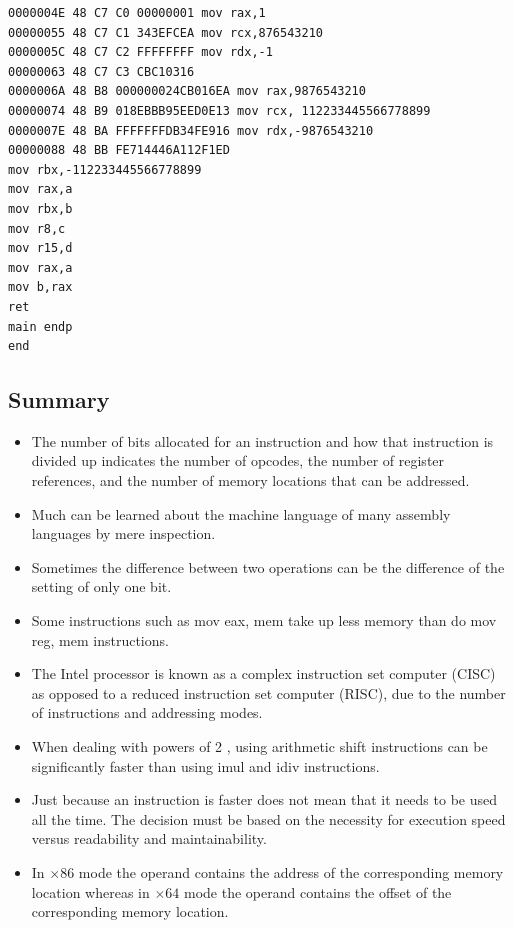 \documentclass[10pt]{book}
\begin{document}
\begin{verbatim}
0000004E 48 C7 C0 00000001 mov rax,1
00000055 48 C7 C1 343EFCEA mov rcx,876543210
0000005C 48 C7 C2 FFFFFFFF mov rdx,-1
00000063 48 C7 C3 CBC10316
0000006A 48 B8 000000024CB016EA mov rax,9876543210
00000074 48 B9 018EBBB95EED0E13 mov rcx, 112233445566778899
0000007E 48 BA FFFFFFFDB34FE916 mov rdx,-9876543210
00000088 48 BB FE714446A112F1ED
mov rbx,-112233445566778899
mov rax,a
mov rbx,b
mov r8,c
mov r15,d
mov rax,a
mov b,rax
ret
main endp
end
\end{verbatim}

\subsection{Summary}
\begin{itemize}
  \item The number of bits allocated for an instruction and how that instruction is divided up indicates the number of opcodes, the number of register references, and the number of memory locations that can be addressed.
  \item Much can be learned about the machine language of many assembly languages by mere inspection.
  \item Sometimes the difference between two operations can be the difference of the setting of only one bit.
  \item Some instructions such as mov eax, mem take up less memory than do mov reg, mem instructions.
  \item The Intel processor is known as a complex instruction set computer (CISC) as opposed to a reduced instruction set computer (RISC), due to the number of instructions and addressing modes.
  \item When dealing with powers of 2 , using arithmetic shift instructions can be significantly faster than using imul and idiv instructions.
  \item Just because an instruction is faster does not mean that it needs to be used all the time. The decision must be based on the necessity for execution speed versus readability and maintainability.
  \item In $\times 86$ mode the operand contains the address of the corresponding memory location whereas in $\times 64$ mode the operand contains the offset of the corresponding memory location.
\end{itemize}
\end{document}
